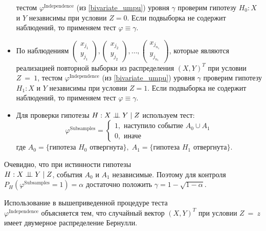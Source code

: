 \begin{itemize}
тестом $\varphi^{\text{Independence}}$ (из \autoref{bivariate_umpu}) уровня $\gamma$
проверим гипотезу $H_0 : X$ и $Y$ независимы при условии $Z=0$. 
Если подвыборка не содержит наблюдений, то применяем тест 
$\varphi \equiv \gamma$.
\item По наблюдениям 
    $
    \begin{pmatrix}
        x_{j_1} \\
        y_{j_1} 
    \end{pmatrix},
    \begin{pmatrix}
        x_{j_2} \\
        y_{j_2}
    \end{pmatrix}, \ldots,
    \begin{pmatrix}
        x_{j_{n_1}} \\
        y_{j_{n_1}}
    \end{pmatrix}
    $, которые являются реализацией 
    повторной выборки из распределения 
    $(X,Y)^T$ при условии $Z~=~1$,
тестом $\varphi^{\text{Independence}}$ (из \autoref{bivariate_umpu}) уровня $\gamma$
проверим гипотезу $H_1 : X$ и $Y$ независимы при условии $Z=1$.
Если подвыборка не содержит наблюдений, то применяем тест 
$\varphi \equiv \gamma$.
\item 
Для проверки гипотезы $H: X \perp\!\!\!\perp Y \mid Z$ используем тест:
$$
\varphi^{\text{Subsamples}}=\begin{cases}
    1, \text{ наступило событие $A_0 \cup A_1$}\\
    0, \text{ иначе}
\end{cases}
$$
где $A_0 = \{\text{гипотеза $H_0$ отвергнута}\},\;
A_1 = \{\text{гипотеза $H_1$ отвергнута}\}$.
\end{itemize}
\begin{remark}
    Очевидно, что при истинности гипотезы \\ $H: X \perp\!\!\!\perp Y \mid Z$,
события $A_0$ и $A_1$ независимые. Поэтому для контроля
$P_{H}(\varphi^{\text{Subsamples}}=1)=\alpha$ достаточно положить
$\gamma = 1 - \sqrt{1-\alpha}$.
\end{remark}
\begin{remark}
    Использование в вышеприведенной процедуре теста\\
    $\varphi^{\text{Independence}}$ объясняется тем, что
    случайный вектор $(X,Y)^T$ при условии $Z~=~z$ имеет двумерное
    распределение Бернулли.
\end{remark}


